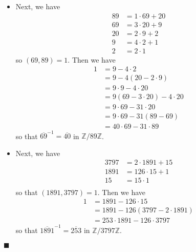 \documentclass[12pt]{article}
\renewcommand{\qed}{\hfill$\blacksquare$}
\renewenvironment{proof}{\begin{addmargin}[1em]{0em}\begin{newproof}}{\end{newproof}\end{addmargin}\qed}
\begin{document}
\begin{proof}
\begin{itemize}
	\item Next, we have
		\begin{equation*}
			\begin{split}		
				89 & = 1\cdot 69 + 20 \\
				69 & = 3 \cdot 20 + 9 \\
				20 & = 2 \cdot 9 + 2 \\
				9 & = 4\cdot 2 + 1 \\
				2 & = 2 \cdot 1
			\end{split}
		\end{equation*} so $\left(69,89\right)=1$. Then we have
		\begin{equation*}
			\begin{split}
				1 & = 9 - 4\cdot 2 \\
				& = 9 - 4\left(20 - 2\cdot 9\right) \\
				& = 9\cdot 9 - 4\cdot 20 \\
				& = 9\left(69 -3\cdot 20\right) - 4\cdot 20 \\
				& = 9 \cdot 69 - 31 \cdot 20 \\
				& = 9\cdot 69 - 31 \left(89-69\right) \\
				& = 40 \cdot 69 - 31\cdot 89
			\end{split}
		\end{equation*} so that $\overline{69}^{-1} = \overline{40}$ in $\mathbb{Z}/89\mathbb{Z}$.
		
		\item Next, we have
		\begin{equation*}
			\begin{split}
				3797 & = 2\cdot 1891 + 15 \\
				1891 & = 126 \cdot 15 + 1 \\
				15 & = 15 \cdot 1 \\
			\end{split}
		\end{equation*} so that $\left(1891,3797\right)=1$. Then we have
		\begin{equation*}\begin{split}
			1 & = 1891 - 126\cdot 15 \\
			& = 1891 - 126 \left(3797-2\cdot 1891\right) \\
			& = 253 \cdot 1891 - 126 \cdot 3797
		\end{split}\end{equation*} so that $\overline{1891}^{-1} = \overline{253}$ in $\mathbb{Z}/3797\mathbb{Z}$.
		

\end{itemize}
\end{proof}
\end{document}
